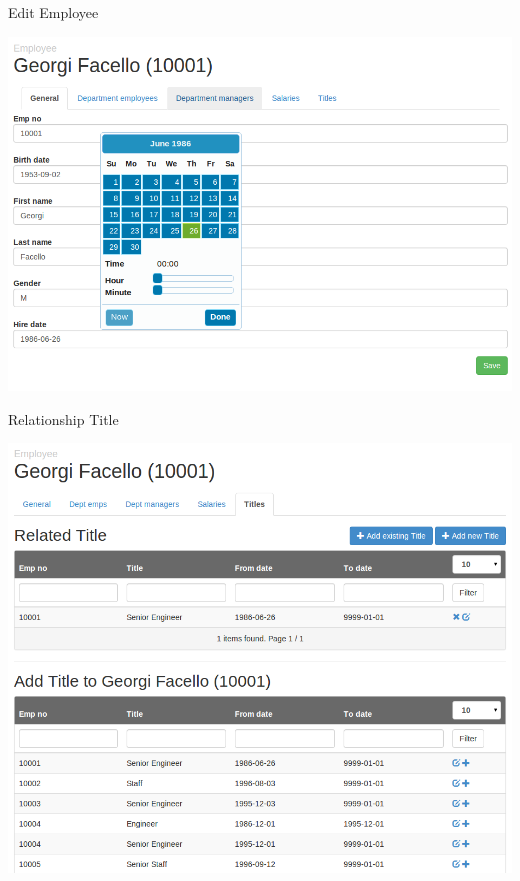 \begin{frame}[plain]{Edit Employee}
  \begin{center}
    \includegraphics[width=\textwidth,height=1\textheight,keepaspectratio]{images/form.png}
  \end{center}
\end{frame}

\begin{frame}[plain]{Relationship Title}
  \begin{center}
    \includegraphics[width=\textwidth,height=1\textheight,keepaspectratio]{images/add-many.png}
  \end{center}
\end{frame}

